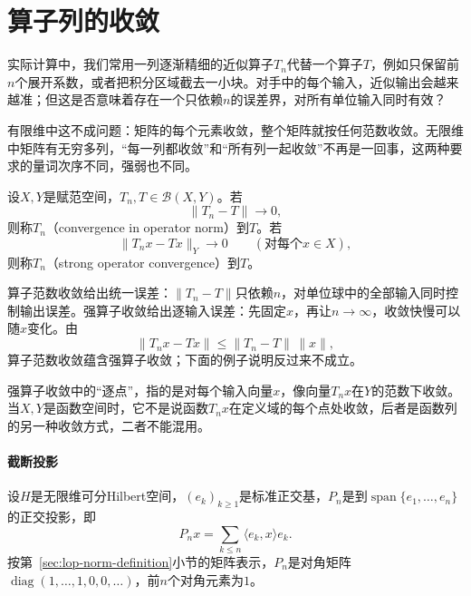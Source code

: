 \section{算子列的收敛}
\label{sec:lop-operator-convergence}

实际计算中，我们常用一列逐渐精细的近似算子$T_n$代替一个算子$T$，例如只保留前$n$个展开系数，或者把积分区域截去一小块。对手中的每个输入，近似输出会越来越准；但这是否意味着存在一个只依赖$n$的误差界，对所有单位输入同时有效？

有限维中这不成问题：矩阵的每个元素收敛，整个矩阵就按任何范数收敛。无限维中矩阵有无穷多列，“每一列都收敛”和“所有列一起收敛”不再是一回事，这两种要求的量词次序不同，强弱也不同。

\begin{definition}[算子范数收敛与强算子收敛]
\label{def:lop-operator-convergence}
设$X,Y$是赋范空间，$T_n,T\in\mathcal B(X,Y)$。若
\begin{equation}
 \lVert T_n-T\rVert\to0,
 \label{eq:lop-norm-convergence}
\end{equation}
则称$T_n$（convergence in operator norm）到$T$。若
\begin{equation}
 \lVert T_nx-Tx\rVert_Y\to0\qquad(\text{对每个}x\in X),
 \label{eq:lop-strong-convergence}
\end{equation}
则称$T_n$（strong operator convergence）到$T$。
\end{definition}

算子范数收敛给出统一误差：$\lVert T_n-T\rVert$只依赖$n$，对单位球中的全部输入同时控制输出误差。强算子收敛给出逐输入误差：先固定$x$，再让$n\to\infty$，收敛快慢可以随$x$变化。由
\[
 \lVert T_nx-Tx\rVert\leq\lVert T_n-T\rVert\,\lVert x\rVert,
\]
算子范数收敛蕴含强算子收敛；下面的例子说明反过来不成立。

强算子收敛中的“逐点”，指的是对每个输入向量$x$，像向量$T_nx$在$Y$的范数下收敛。当$X,Y$是函数空间时，它不是说函数$T_nx$在定义域的每个点处收敛，后者是函数列的另一种收敛方式，二者不能混用。

\paragraph{截断投影}
设$H$是无限维可分Hilbert空间，$(e_k)_{k\geq1}$是标准正交基，$P_n$是到$\operatorname{span}\{e_1,\ldots,e_n\}$的正交投影，即
\[
 P_nx=\sum_{k\leq n}\langle e_k,x\rangle e_k.
\]
按第~\ref{sec:lop-norm-definition}小节的矩阵表示，$P_n$是对角矩阵$\operatorname{diag}(1,\ldots,1,0,0,\ldots)$，前$n$个对角元素为$1$。

